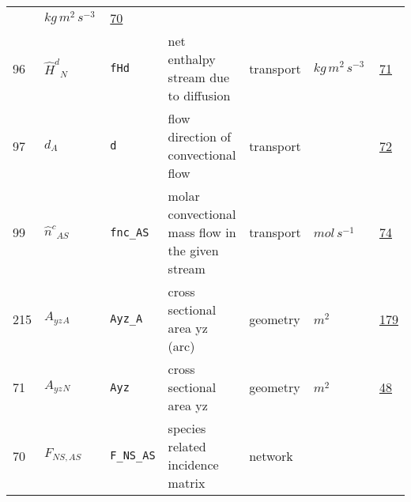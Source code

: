 \begin{longtable}{|p{1cm}|p{2.5cm}|p{4.5cm}|p{8cm}|p{3.0cm}|p{3cm}|p{1cm}|}
             & $ kg \,m^{2} \,s^{-3} \, $
             &                 \hyperlink{"e:70"}{ 70 }
                 \\
            96
             & \hypertarget{"v:96"}{ $ {{\hat{H}^d}}{_{N}} $}
             & \verb|fHd|
             & net enthalpy stream due to diffusion
             & \begin{lay}transport \end{lay}
             & $ kg \,m^{2} \,s^{-3} \, $
             &                 \hyperlink{"e:71"}{ 71 }
                 \\
            97
             & \hypertarget{"v:97"}{ $ {d}{_{A}} $}
             & \verb|d|
             & flow direction of convectional flow
             & \begin{lay}transport \end{lay}
             & $  $
             &                 \hyperlink{"e:72"}{ 72 }
                 \\
            99
             & \hypertarget{"v:99"}{ $ {{\hat{n}^c}}{_{{A S}}} $}
             & \verb|fnc_AS|
             & molar convectional mass flow in the given stream
             & \begin{lay}transport \end{lay}
             & $ mol \,s^{-1} \, $
             &                 \hyperlink{"e:74"}{ 74 }
                 \\
            215
             & \hypertarget{"v:215"}{ $ {{A_{yz}}}{_{A}} $}
             & \verb|Ayz_A|
             & cross sectional area yz (arc)
             & \begin{lay}geometry \end{lay}
             & $ m^{2} \, $
             &                 \hyperlink{"e:179"}{ 179 }
                 \\
            71
             & \hypertarget{"v:71"}{ $ {{A_{yz}}}{_{N}} $}
             & \verb|Ayz|
             & cross sectional area yz
             & \begin{lay}geometry \end{lay}
             & $ m^{2} \, $
             &                 \hyperlink{"e:48"}{ 48 }
                 \\
            70
             & \hypertarget{"v:70"}{ $ {F}{_{{N S}, {A S}}} $}
             & \verb|F_NS_AS|
             & species related incidence matrix
             & \begin{lay}network \end{lay}
             & $  $
             & \\

\end{longtable}
